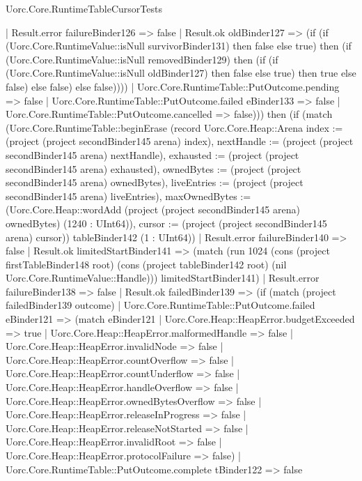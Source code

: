 \begin{lexlean}{Uorc.Core.RuntimeTableCursorTests}
\begin{semanticmodule}
{                          | Result.error failureBinder126 => false
                          | Result.ok oldBinder127 => (if (if (Uorc.Core.RuntimeValue::isNull survivorBinder131) then false else true) then (if (Uorc.Core.RuntimeValue::isNull removedBinder129) then (if (if (Uorc.Core.RuntimeValue::isNull oldBinder127) then false else true) then true else false) else false) else false))))
                    | Uorc.Core.RuntimeTable::PutOutcome.pending => false
                    | Uorc.Core.RuntimeTable::PutOutcome.failed eBinder133 => false
                    | Uorc.Core.RuntimeTable::PutOutcome.cancelled => false))) then (if (match (Uorc.Core.RuntimeTable::beginErase (record Uorc.Core.Heap::Arena {index := (project (project secondBinder145 arena) index), nextHandle := (project (project secondBinder145 arena) nextHandle), exhausted := (project (project secondBinder145 arena) exhausted), ownedBytes := (project (project secondBinder145 arena) ownedBytes), liveEntries := (project (project secondBinder145 arena) liveEntries), maxOwnedBytes := (Uorc.Core.Heap::wordAdd (project (project secondBinder145 arena) ownedBytes) (1240 : UInt64)), cursor := (project (project secondBinder145 arena) cursor)}) tableBinder142 (1 : UInt64))
                | Result.error failureBinder140 => false
                | Result.ok limitedStartBinder141 => (match (run 1024 (cons (project firstTableBinder148 root) (cons (project tableBinder142 root) (nil Uorc.Core.RuntimeValue::Handle))) limitedStartBinder141)
                  | Result.error failureBinder138 => false
                  | Result.ok failedBinder139 => (if (match (project failedBinder139 outcome)
                    | Uorc.Core.RuntimeTable::PutOutcome.failed eBinder121 => (match eBinder121
                      | Uorc.Core.Heap::HeapError.budgetExceeded => true
                      | Uorc.Core.Heap::HeapError.malformedHandle => false
                      | Uorc.Core.Heap::HeapError.invalidNode => false
                      | Uorc.Core.Heap::HeapError.countOverflow => false
                      | Uorc.Core.Heap::HeapError.countUnderflow => false
                      | Uorc.Core.Heap::HeapError.handleOverflow => false
                      | Uorc.Core.Heap::HeapError.ownedBytesOverflow => false
                      | Uorc.Core.Heap::HeapError.releaseInProgress => false
                      | Uorc.Core.Heap::HeapError.releaseNotStarted => false
                      | Uorc.Core.Heap::HeapError.invalidRoot => false
                      | Uorc.Core.Heap::HeapError.protocolFailure => false)
                    | Uorc.Core.RuntimeTable::PutOutcome.complete tBinder122 => false
}
\end{semanticmodule}
\end{lexlean}

